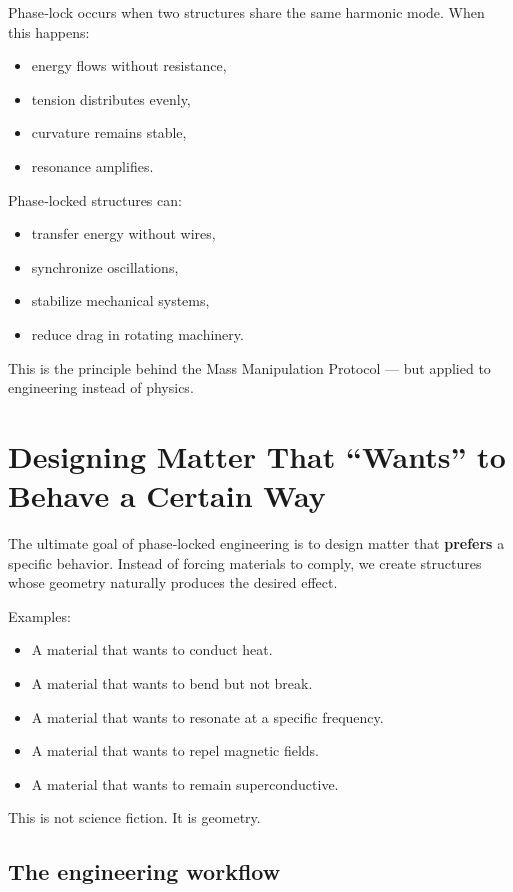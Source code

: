 \documentclass[11pt, letterpaper, openany]{book}
\begin{document}
Phase‑lock occurs when two structures share the same harmonic mode. When this
happens:

\begin{itemize}
    \item energy flows without resistance,
    \item tension distributes evenly,
    \item curvature remains stable,
    \item resonance amplifies.
\end{itemize}

Phase‑locked structures can:

\begin{itemize}
    \item transfer energy without wires,
    \item synchronize oscillations,
    \item stabilize mechanical systems,
    \item reduce drag in rotating machinery.
\end{itemize}

This is the principle behind the Mass Manipulation Protocol — but applied to engineering
instead of physics.

\section{Designing Matter That ``Wants'' to Behave a Certain Way}

The ultimate goal of phase‑locked engineering is to design matter that \textbf{prefers} a
specific behavior. Instead of forcing materials to comply, we create structures whose
geometry naturally produces the desired effect.

Examples:

\begin{itemize}
    \item A material that wants to conduct heat.
    \item A material that wants to bend but not break.
    \item A material that wants to resonate at a specific frequency.
    \item A material that wants to repel magnetic fields.
    \item A material that wants to remain superconductive.
\end{itemize}

This is not science fiction. It is geometry.

\subsection*{The engineering workflow}
\end{document}
